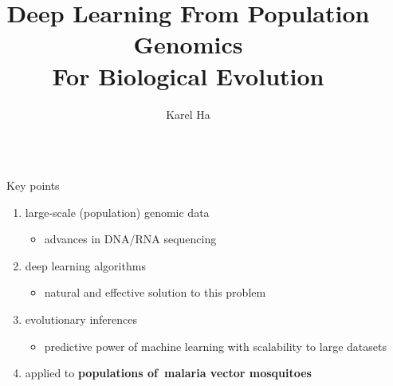 \documentclass[final,hyperref={pdfpagelabels=false}]{beamer}
\title{\huge Deep Learning
From Population Genomics \\
For Biological Evolution} %
\author{Karel Ha} %
\institute{
Life Sciences -- Faculty of Natural Sciences\\
Imperial College London} %
\begin{document}

\begin{frame}[t] %

\begin{columns}[t] %

\begin{column}{.02\textwidth}\end{column} %

\begin{column}{.465\textwidth} %


\begin{block}{Key points}
\begin{enumerate}
    \item large-scale (population) genomic data
    \begin{itemize}
        \item advances in DNA/RNA sequencing
    \end{itemize}
    
    \item deep learning algorithms
    \begin{itemize}
        \item natural and effective solution to this problem
    \end{itemize}
    
    \item evolutionary inferences
    \begin{itemize}
        \item  predictive power of machine learning with scalability to large datasets
    \end{itemize}
    
    \item applied to \textbf{populations of~malaria vector mosquitoes}
\end{enumerate}

\end{block}


\end{column}
\end{columns}
\end{frame}
\end{document}
